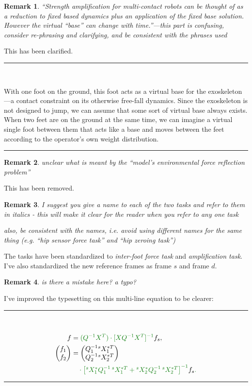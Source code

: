 \documentclass[10pt,letterpaper]{letter}
\newcommand*{\ta}[1]{\textcolor[HTML]{107f10}{#1}}
\newcounter{reviewer}
\newtheorem{rev}{Remark}[reviewer]
\newcommand{\reviewer}[1]{\begin{rev} #1\end{rev}}
\newcommand{\response}[1]{\par{\hfill\begin{minipage}{\dimexpr\textwidth-2cm} #1\end{minipage}}}
\newcommand{\paperquote}[1]{%
	\begin{center}
		
		\begin{minipage}{.8\textwidth}
			{\rule{\textwidth}{.5pt}}\vspace{.5em}\\
			\begin{minipage}{\textwidth}\setlength{\parindent}{2em}#1\end{minipage}
			\vspace{.5em}
			{\rule{\textwidth}{.5pt}}
		\end{minipage}%
	\end{center}
}
\begin{document}
\begin{letter}{}
\reviewer{``Strength amplification for multi-contact robots can be thought of as a reduction to fixed based dynamics plus an application of the fixed base solution. However the virtual ``base''  can change with time.''---this part is confusing, consider re-phrasing and clarifying, and be consistent with the phrases used}
\response{This has been clarified.}
\paperquote{
\ta{With one foot on the ground, this foot acts as a virtual base for the exoskeleton---a contact constraint on its otherwise free-fall dynamics.
	Since the exoskeleton is not designed to jump, we can assume that some sort of virtual base always exists.}
When two feet are on the ground at the same time,
\ta{we can imagine a virtual single foot between them that acts like a base and moves between the feet according to the operator's own weight distribution.}
}


\reviewer{unclear what is meant by the ``model's environmental force reflection problem''
}
\response{This has been removed.}

\reviewer{I suggest you give a name to each of the two tasks and refer to them in italics - this will make it clear for the reader when you refer to any one task
	
	also, be consistent with the names, i.e. avoid using different names for the same thing (e.g. ``hip sensor force task'' and ``hip zeroing task'')}
\response{The tasks have been standardized to \ta{\emph{inter-foot force task}} and \ta{\emph{amplification task}}. I've also standardized the new reference frames as \ta{frame $s$} and \ta{frame $d$}.
}

\reviewer{is there a mistake here? a typo?}
\response{I've improved the typesetting on this multi-line equation to be clearer:}
\paperquote{\begin{align}
	f &= \ta{(Q^{-1}X^T)\cdot[XQ^{-1}X^T]^{-1}} f_s,\\
	\begin{pmatrix} f_1\\f_2\end{pmatrix} &= \begin{pmatrix}Q_1^{-1} {^sX_1^{*T}} \\ Q_2^{-1} {^sX_2^{*T}}\end{pmatrix}\nonumber\\
	&\ta{\rule{1em}{0pt}\cdot \begin{bmatrix} {^sX_1^*}Q_1^{-1}{\,^sX_1^{*T}}+{^sX_2^*}Q_2^{-1}{\,^sX_2^{*T}}\end{bmatrix}^{-1}} f_s\ta{.}
	\end{align}}



\end{letter}
\end{document}
